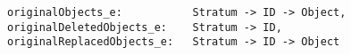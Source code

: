 \lstset{frame=tb, aboveskip=12pt, belowskip=-3pt, breaklines=true, basicstyle=\small\ttfamily, tabsize=2, mathescape=true}
\begin{lstlisting}[caption={base\_deltas.als, lines 33-35}, label=alloy:originals, captionpos=b]
originalObjects_e:           Stratum -> ID -> Object,
originalDeletedObjects_e:    Stratum -> ID,
originalReplacedObjects_e:   Stratum -> ID -> Object
\end{lstlisting}

